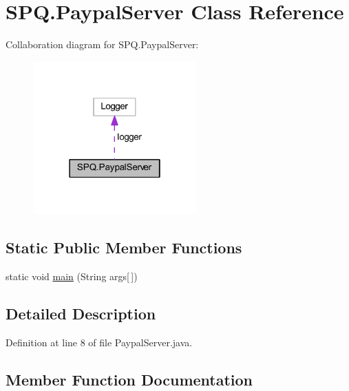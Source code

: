 \hypertarget{class_s_p_q_1_1_paypal_server}{}\section{S\+P\+Q.\+Paypal\+Server Class Reference}
\label{class_s_p_q_1_1_paypal_server}


Collaboration diagram for S\+P\+Q.\+Paypal\+Server\+:
\nopagebreak
\begin{figure}[H]
\begin{center}
\leavevmode
\includegraphics[width=178pt]{class_s_p_q_1_1_paypal_server__coll__graph}
\end{center}
\end{figure}
\subsection*{Static Public Member Functions}
\begin{DoxyCompactItemize}
\item 
static void \mbox{\hyperlink{class_s_p_q_1_1_paypal_server_aa704ce67562c143df7cdaf34f74f59ac}{main}} (String args\mbox{[}$\,$\mbox{]})
\end{DoxyCompactItemize}


\subsection{Detailed Description}


Definition at line 8 of file Paypal\+Server.\+java.



\subsection{Member Function Documentation}
\mbox{\label{class_s_p_q_1_1_paypal_server_aa704ce67562c143df7cdaf34f74f59ac}} 
